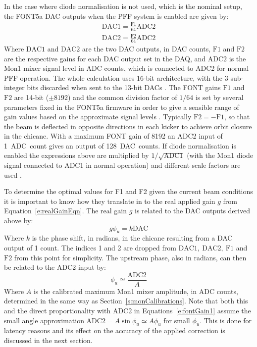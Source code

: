 In the case where diode normalisation is not used, which is the nominal setup, the FONT5a DAC outputs when the PFF system is enabled are given by:
\begin{eqnarray}
\mathrm{DAC1} = \frac{\mathrm{F1}}{64}\mathrm{ADC2} \nonumber \\ 
\mathrm{DAC2} = \frac{\mathrm{F2}}{64}\mathrm{ADC2} \label{e:fontGain1}
\end{eqnarray}
Where \(\mathrm{DAC1}\) and \(\mathrm{DAC2}\) are the two DAC outputs, in DAC counts, \(\mathrm{F1}\) and \(\mathrm{F2}\) are the respective gains for each DAC output set in the DAQ, and \(\mathrm{ADC2}\) is the Mon1 mixer signal level in ADC counts, which is connected to ADC2 for normal PFF operation. The whole calculation uses 16-bit architecture, with the 3 sub-integer bits discarded when sent to the 13-bit DACs \cite{glennPriv}. The FONT gains \(\mathrm{F1}\) and \(\mathrm{F2}\) are 14-bit (\(\pm8192\)) and the common division factor of \(1/64\) is set by several parameters fixed in the FONT5a firmware in order to give a sensible range of gain values based on the approximate signal levels \cite{glennPriv}. Typically \(\mathrm{F2} = -\mathrm{F1}\), so that the beam is deflected in opposite directions in each kicker to achieve orbit closure in the chicane. With a maximum FONT gain of 8192 an ADC2 input of 1~ADC~count gives an output of 128~DAC~counts. If diode normalisation is enabled the expressions above are multiplied by \(1/\sqrt{\mathrm{ADC1}}\) (with the Mon1 diode signal connected to ADC1 in normal operation) and different scale factors are used \cite{glennPriv}.

To determine the optimal values for F1 and F2 given the current beam conditions it is important to know how they translate in to the real applied gain \(g\) from Equation~\ref{e:realGainEqn}. The real gain \(g\) is related to the DAC outputs derived above by:
\begin{equation} \label{e:fontGain2}
g\phi_u = k\mathrm{DAC}
\end{equation}
Where \(k\) is the phase shift, in radians, in the chicane resulting from a DAC output of 1 count. The indices 1 and 2 are dropped from \(\mathrm{DAC1,~DAC2,~F1}\) and \(\mathrm{F2}\) from this point for simplicity. The upstream phase, also in radians, can then be related to the ADC2 input by:
\begin{equation} \label{e:fontGain3}
\phi_u \simeq \frac{\mathrm{ADC2}}{A}
\end{equation}
Where \(A\) is the calibrated maximum Mon1 mixer amplitude, in ADC counts, determined in the same way as Section~\ref{s:monCalibrations}. Note that both this and the direct proportionality with ADC2 in Equations~\ref{e:fontGain1} assume the small angle approximation \(\mathrm{ADC2} = A\sin\phi_u \simeq A\phi_u\) for small \(\phi_u\). This is done for latency reasons \cite{glennPriv} and its effect on the accuracy of the applied correction is discussed in the next section.

